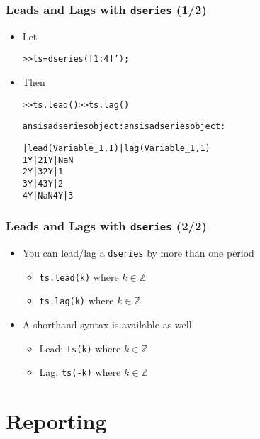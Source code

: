 \documentclass[10pt]{beamer}
\newcommand{\myitem}{\item[$\bullet$]}
\begin{document}
\begin{frame}[fragile,t]
  \frametitle{Leads and Lags with \texttt{dseries} (1/2)}
  \begin{itemize}
    \myitem Let
    \begin{alltt}
  >> ts = dseries([1:4]');
    \end{alltt}
    \myitem Then
    \begin{alltt}
  >> ts.lead()                      >> ts.lag()

  ans is a dseries object:          ans is a dseries object:

     | lead(Variable_1,1)              | lag(Variable_1,1)
  1Y | 2                            1Y | NaN
  2Y | 3                            2Y | 1
  3Y | 4                            3Y | 2
  4Y | NaN                          4Y | 3
    \end{alltt}
  \end{itemize}
\end{frame}


\begin{frame}[fragile,t]
  \frametitle{Leads and Lags with \texttt{dseries} (2/2)}
  \begin{itemize}
    \myitem You can lead/lag a \texttt{dseries} by more than one period
    \begin{itemize}
      \myitem \texttt{ts.lead(k)} where $k\in\mathbb{Z}$
      \myitem \texttt{ts.lag(k)} where $k\in\mathbb{Z}$
    \end{itemize}
    \myitem A shorthand syntax is available as well
    \begin{itemize}
      \myitem Lead: \texttt{ts(k)} where $k\in\mathbb{Z}$
      \myitem Lag: \texttt{ts(-k)} where $k\in\mathbb{Z}$
    \end{itemize}
  \end{itemize}
\end{frame}




%
%
\section{Reporting}
\end{document}
